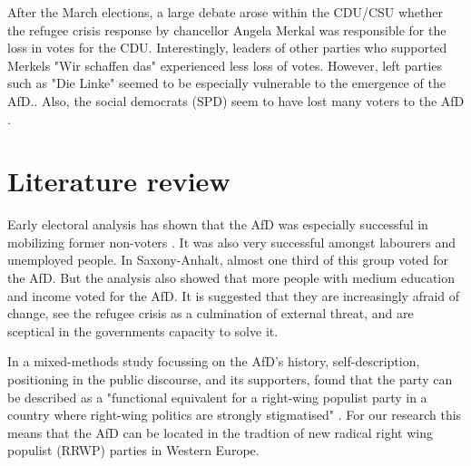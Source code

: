 \documentclass[12pt, hidelinks]{article}
\begin{document}
After the March elections, a large debate arose within the CDU/CSU whether the refugee crisis response by chancellor Angela Merkal was responsible for the loss in votes for the CDU. Interestingly, leaders of other parties who supported Merkels "Wir schaffen das" experienced less loss of votes. However, left parties such as "Die Linke" seemed to be especially vulnerable to the emergence of the AfD.\cite{Spiegel2016}. Also, the social democrats (SPD) seem to have lost many voters to the AfD \cite{Zeit2016}.


\section{Literature review}

Early electoral analysis has shown that the AfD was especially successful in mobilizing former non-voters \cite{Spiegel2016}. It was also very successful amongst labourers and unemployed people. In Saxony-Anhalt, almost one third of this group voted for the AfD. But the analysis also showed that more people with medium education and income voted for the AfD. It is suggested that they are increasingly afraid of change, see the refugee crisis as a culmination of external threat, and are sceptical in the governments capacity to solve it\cite{Zeit2016}. 

In a mixed-methods study focussing on the AfD's history, self-description, positioning in the public discourse, and its supporters,  found that the party can be described as a "functional equivalent for a right-wing populist party in a country where right-wing politics are strongly stigmatised" \cite{Berbuir2015}. For our research this means that the AfD can be located in the tradtion of new radical right wing populist (RRWP) parties in Western Europe.
\end{document}
